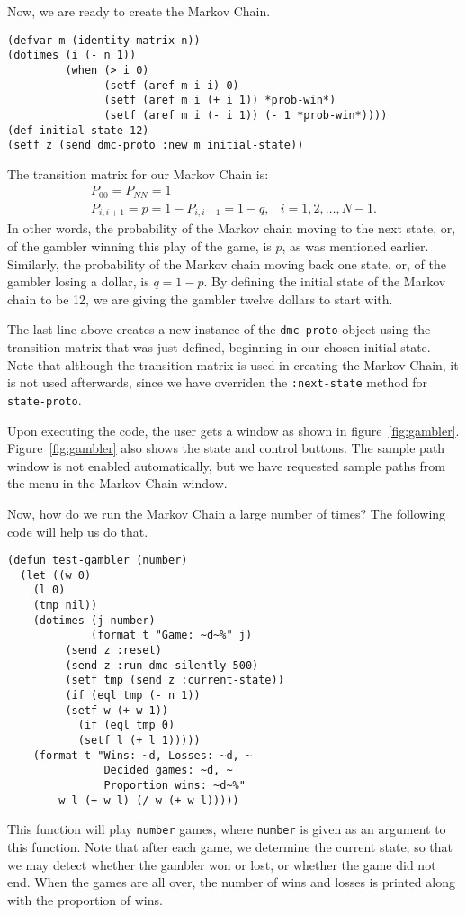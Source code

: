 Now, we are ready to create the Markov Chain. 
\begin{verbatim}
(defvar m (identity-matrix n))
(dotimes (i (- n 1))
         (when (> i 0)
               (setf (aref m i i) 0)
               (setf (aref m i (+ i 1)) *prob-win*)
               (setf (aref m i (- i 1)) (- 1 *prob-win*))))
(def initial-state 12)
(setf z (send dmc-proto :new m initial-state))
\end{verbatim}
The transition matrix for our Markov Chain is:
\[ \begin{array}{ll}
	P_{00}=P_{NN}=1 & \\
   	P_{i,i+1}=p=1-P_{i,i-1}=1-q, & i=1,2,\ldots,N-1.
   \end{array} \]
In other words, the probability of the Markov chain moving to the next
state, or, of the gambler winning this play of the game, is $p$, as
was mentioned earlier.  Similarly, the probability of the Markov chain
moving back one state, or, of the gambler losing a dollar, is $q=1-p$.
By defining the initial state of the Markov chain to be 12, we are giving
the gambler twelve dollars to start with.

The last line above creates a new instance of the {\tt dmc-proto}
object using the transition matrix that was just defined, beginning in
our chosen initial state.  Note that although the transition matrix is
used in creating the Markov Chain, it is not used afterwards, since we
have overriden the {\tt :next-state} method for {\tt state-proto}. 

Upon executing the code, the user gets a window as shown in
figure~\ref{fig:gambler}.  Figure~\ref{fig:gambler} also shows the
state and control buttons.  The sample path window is not enabled
automatically, but we have requested sample paths from the menu in the
Markov Chain window.

Now, how do we run the Markov Chain a large number of times?  The
following code will help us do that.
\begin{verbatim}
(defun test-gambler (number)
  (let ((w 0)
	(l 0)
	(tmp nil))
    (dotimes (j number)
             (format t "Game: ~d~%" j)
	     (send z :reset)
	     (send z :run-dmc-silently 500)
	     (setf tmp (send z :current-state))
	     (if (eql tmp (- n 1))
		 (setf w (+ w 1))
	       (if (eql tmp 0)
		   (setf l (+ l 1)))))
    (format t "Wins: ~d, Losses: ~d, ~
               Decided games: ~d, ~
               Proportion wins: ~d~%"
	    w l (+ w l) (/ w (+ w l)))))
\end{verbatim}
This function will play {\tt number} games, where {\tt number} is
given as an argument to this function.  Note that after each game, we
determine the current state, so that we may detect whether the gambler
won or lost, or whether the game did not end.  When the games are all
over, the number of wins and losses is printed along with the
proportion of wins. 


